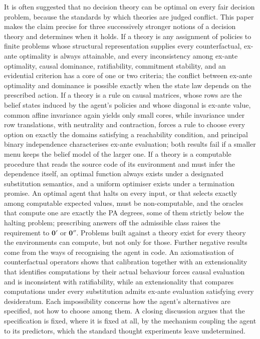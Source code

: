 \begin{center}
\begin{minipage}{27pc}
  \small
  \enspace
  It is often suggested that no decision theory can be optimal on every fair decision problem,
  because the standards by which theories are judged conflict. This paper makes the claim precise
  for three successively stronger notions of a decision theory and determines when it holds. If a
  theory is any assignment of policies to finite problems whose structural representation supplies
  every counterfactual, ex-ante optimality is always attainable, and every inconsistency among
  ex-ante optimality, causal dominance, ratifiability, commitment stability, and an evidential
  criterion has a core of one or two criteria; the conflict between ex-ante optimality and dominance
  is possible exactly when the state law depends on the prescribed action. If a theory is a rule on
  causal matrices, whose rows are the belief states induced by the agent's policies and whose
  diagonal is ex-ante value, common affine invariance again yields only small cores, while
  invariance under row translations, with neutrality and contraction, forces a rule to choose every
  option on exactly the domains satisfying a reachability condition, and principal binary
  independence characterises ex-ante evaluation; both results fail if a smaller menu keeps the belief
  model of the larger one. If a theory is a computable procedure that reads the source code of its
  environment and must infer the dependence itself, an optimal function always exists under a
  designated substitution semantics, and a uniform optimiser exists under a termination promise. An
  optimal agent that halts on every input, or that selects exactly among computable expected values,
  must be non-computable, and the oracles that compute one are exactly the PA degrees, some of them
  strictly below the halting problem; prescribing answers off the admissible class raises the
  requirement to $\mathbf 0'$ or $\mathbf 0''$. Problems built against a theory exist for every
  theory the environments can compute, but not only for those. Further negative results come from
  the ways of recognising the agent in code. An axiomatisation of counterfactual operators shows that calibration together with an
  extensionality that identifies computations by their actual behaviour forces causal evaluation and
  is inconsistent with ratifiability, while an extensionality that compares computations under every
  substitution admits ex-ante evaluation satisfying every desideratum. Each impossibility concerns how
  the agent's alternatives are specified, not how to choose among them. A closing discussion argues
  that the specification is fixed, where it is fixed at all, by the mechanism coupling the agent to
  its predictors, which the standard thought experiments leave undetermined.
\end{minipage}
\end{center}
